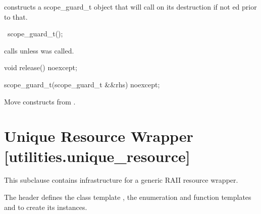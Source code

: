 \documentclass[ebook,11pt,article]{memoir}
\begin{document}
\pnum
\effects constructs a scope_guard_t object that will call  on its destruction if not ed prior to that.

\begin{itemdecl}
~scope_guard_t();
\end{itemdecl}

\pnum
\effects calls  unless  was called.

\begin{itemdecl}
void release() noexcept;
\end{itemdecl}

\pnum
\effects {}

\begin{itemdecl}
scope_guard_t(scope_guard_t  &&rhs) noexcept;
\end{itemdecl}

\pnum
\effects Move constructs  from . 



\section{Unique Resource Wrapper [utilities.unique_resource]}
This subclause contains infrastructure for a generic RAII resource wrapper.



\pnum
The header   defines the class template , the enumeration  and function templates  and  to create its instances.
\end{document}
